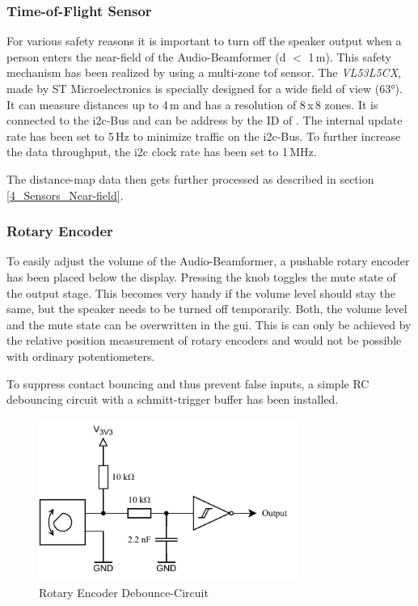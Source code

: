 \subsubsection{Time-of-Flight Sensor}
For various safety reasons it is important to turn off the speaker output when a person enters the near-field of the Audio-Beamformer (d $<$ 1\,m). This safety mechanism has been realized by using a multi-zone \acrfull{tof} sensor. The \textit{VL53L5CX}, made by ST Microelectronics is specially designed for a wide field of view (63°). It can measure distances up to 4\,m and has a resolution of 8\,x\,8 zones. It is connected to the \acrshort{i2c}-Bus and can be address by the ID of . The internal update rate has been set to 5\,Hz to minimize traffic on the \acrshort{i2c}-Bus. To further increase the data throughput, the \acrshort{i2c} clock rate has been set to 1\,MHz.

The distance-map data then gets further processed as described in section \ref{4_Sensors_Near-field}.

\newpage
\subsubsection{Rotary Encoder}
To easily adjust the volume of the Audio-Beamformer, a pushable rotary encoder has been placed below the display. Pressing the knob toggles the mute state of the output stage. This becomes very handy if the volume level should stay the same, but the speaker needs to be turned off temporarily. Both, the volume level and the mute state can be overwritten in the \acrshort{gui}. This is can only be achieved by the relative position measurement of rotary encoders and would not be possible with ordinary potentiometers.

To suppress contact bouncing and thus prevent false inputs, a simple RC debouncing circuit with a schmitt-trigger buffer has been installed.

\begin{figure}[h!]
	\centering
	\includegraphics[width=8.5cm]{images/4_Design/Hardware/Rotary Encoder Debounce.pdf}
	\vspace{-0.1cm}
    \caption{Rotary Encoder Debounce-Circuit}
    \label{fig:rotary_encoder-debounce_circuit}
\end{figure}

